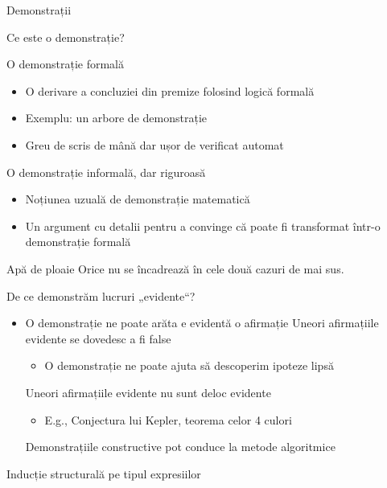 \documentclass[xcolor=pdftex,romanian,colorlinks]{beamer}
\begin{document}
\begin{section}{Demonstrații}


\begin{frame}{Ce este o demonstrație?}
\begin{block}{O demonstrație formală}
\begin{itemize}
\item O derivare a concluziei din premize folosind logică formală
\item Exemplu: un arbore de demonstrație
\item Greu de scris de mână dar ușor de verificat automat
\end {itemize}
\end{block}
\begin{block}{O demonstrație informală, dar riguroasă}
\begin{itemize}
\item Noțiunea uzuală de demonstrație matematică
\item Un argument cu  detalii pentru a convinge că poate fi transformat într-o demonstrație formală
\end {itemize}
\end{block}
\begin{block}{Apă de ploaie}
Orice nu se încadrează în cele două cazuri de mai sus.
\end {block}
\end{frame}

\begin{frame}{De ce demonstrăm lucruri „evidente“?}
\begin{itemize}
\item<1-> O demonstrație ne poate arăta  e evidentă o afirmație
 Uneori afirmațiile evidente se dovedesc a fi \alert{false}
\begin{itemize}
\item<3-> O demonstrație ne poate ajuta să descoperim ipoteze lipsă
\end{itemize}
 Uneori afirmațiile evidente nu sunt deloc evidente
\begin{itemize}
\item<4-> E.g., Conjectura lui Kepler, teorema celor 4 culori
\end{itemize}
 Demonstrațiile constructive pot conduce la metode algoritmice
\end{itemize}
\end{frame}



\begin{subsection}{Inducție structurală pe tipul expresiilor}


\end{subsection}
\end{section}
\end{document}
